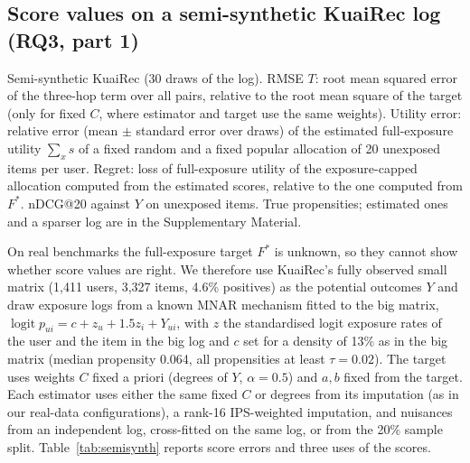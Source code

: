 \documentclass[preprint,review,12pt,authoryear]{elsarticle}
\theoremstyle{definition}
\begin{document}
\subsection{Score values on a semi-synthetic KuaiRec log (RQ3, part 1)}\label{sec:semisynth}

\begin{table}[t]\centering\small
\caption{Semi-synthetic KuaiRec (30 draws of the log). RMSE $T$: root mean
squared error of the three-hop term over all pairs, relative to the root
mean square of the target (only for fixed $C$, where estimator and target use
the same weights). Utility error: relative error (mean $\pm$ standard error over
draws) of the estimated full-exposure utility $\sum_x s$ of a fixed random and a
fixed popular allocation of 20 unexposed items per user. Regret: loss of
full-exposure utility of the exposure-capped allocation computed from the
estimated scores, relative to the one computed from $F^*$. nDCG@20 against $Y$
on unexposed items. True propensities; estimated ones and a sparser log are
in the Supplementary Material.}\label{tab:semisynth}
\begin{adjustbox}{max width=\textwidth}

\end{adjustbox}
\end{table}

On real benchmarks the full-exposure target $F^*$ is unknown, so they cannot show
whether score values are right. We therefore use KuaiRec's fully observed small matrix
(1{,}411 users, 3{,}327 items, 4.6\% positives) as the potential outcomes $Y$ and
draw exposure logs from a known MNAR mechanism fitted to the big matrix,
$\operatorname{logit}p_{ui}=c+z_u+1.5z_i+Y_{ui}$, with $z$ the standardised logit
exposure rates of the user and the item in the big log and $c$ set for a
density of 13\% as in the big matrix (median propensity 0.064, all
propensities at least $\tau=0.02$). The target uses weights $C$ fixed a priori
(degrees of $Y$, $\alpha=0.5$) and $a,b$ fixed from the target. Each estimator
uses either the same fixed $C$ or degrees from its imputation (as in our
real-data configurations), a rank-16 IPS-weighted imputation, and nuisances
from an independent log, cross-fitted on the same log, or from the 20\% sample
split. Table~\ref{tab:semisynth} reports score errors and three uses of the
scores.
\end{document}
